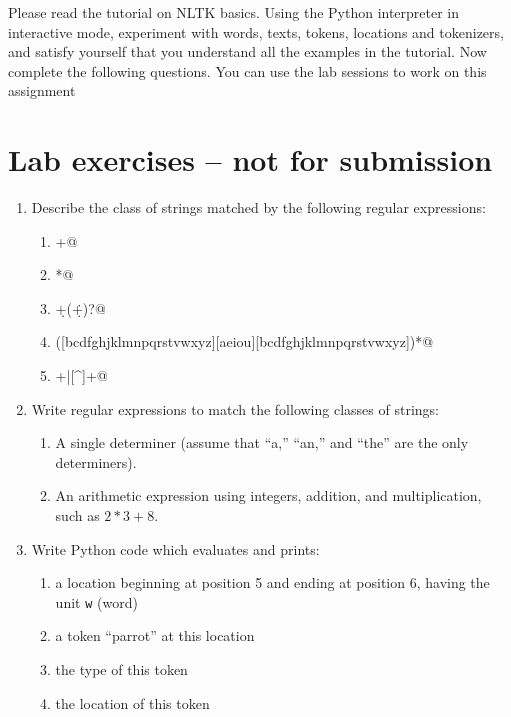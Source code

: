 \documentclass[a4paper,12pt]{460}
\begin{document}
\maketitle

Please read the tutorial on NLTK basics.
Using the Python interpreter in interactive mode, experiment
with words, texts, tokens, locations and tokenizers, and satisfy
yourself that you understand all the examples in the tutorial.
Now complete the following questions.
You can use the lab sessions to work on this assignment

\section*{Lab exercises -- not for submission}

\begin{enumerate}
\item
Describe the class of strings matched by the following regular expressions:

\begin{enumerate}
    \item \verb@[a-zA-Z]+@
    \item \verb@[A-Z][a-z]*@
    \item \verb@\d+(\.\d+)?@
    \item \verb@([bcdfghjklmnpqrstvwxyz][aeiou][bcdfghjklmnpqrstvwxyz])*@
    \item \verb@\w+|[^\w\s]+@
\end{enumerate}

\item
Write regular expressions to match the following classes of strings:

\begin{enumerate}
    \item A single determiner (assume that ``a,'' ``an,'' and ``the''
    are the only determiners).  
    \item An arithmetic expression using integers, addition, and
    multiplication, such as $2*3+8$.
\end{enumerate}

\item
Write Python code which evaluates and prints:

\begin{enumerate}
    \item a location beginning at position 5 and ending at position 6,
      having the unit \texttt{w} (word)
    \item a token ``parrot'' at this location
    \item the type of this token
    \item the location of this token
\end{enumerate}
\end{enumerate}
\end{document}
